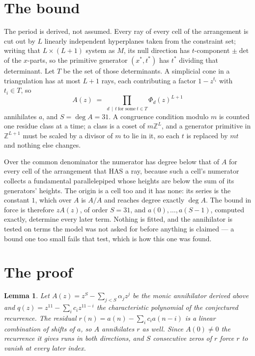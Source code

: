 \documentclass[11pt,a4paper]{article}
\theoremstyle{plain}
\newtheorem{lemma}[theorem]{Lemma}
\theoremstyle{definition}
\begin{document}
\section{The bound}

The period is derived, not assumed. Every ray of every cell of the arrangement is cut out by
$L$ linearly independent hyperplanes taken from the constraint set; writing that $L\times(L+1)$
system as $M$, its null direction has $t$-component $\pm\det$ of the $x$-parts, so the
primitive generator $(x^*,t^*)$ has $t^*$ dividing that determinant. Let $T$ be the set of
those determinants. A simplicial cone in a triangulation has at most $L+1$ rays, each
contributing a factor $1-z^{t_i}$ with $t_i\in T$, so
\[
A(z)\;=\;\prod_{d\,\mid\,t\ \text{for some}\ t\in T}\Phi_d(z)^{L+1}
\]
annihilates $a$, and $S=\deg A=31$. A congruence condition modulo $m$ is counted one residue
class at a time; a class is a coset of $m\mathbb{Z}^L$, and a generator primitive in
$\mathbb{Z}^{L+1}$ must be scaled by a divisor of $m$ to lie in it, so each $t$ is replaced
by $mt$ and nothing else changes.

Over the common denominator the numerator has degree below that of $A$ for every cell of the
arrangement that HAS a ray, because such a cell's numerator collects a fundamental
parallelepiped whose heights are below the sum of its generators' heights. The origin is a cell
too and it has none: its series is the constant $1$, which over $A$ is $A/A$ and reaches degree
exactly $\deg A$. The bound in force is therefore $zA(z)$, of order $S=31$, and
$a(0),\dots,a(S-1)$, computed exactly, determine every later term. Nothing is fitted, and the
annihilator is tested on terms the model was not asked for before anything is claimed --- a
bound one too small fails that test, which is how this one was found.

\section{The proof}

\begin{lemma}\label{lem:crit}
Let $A(z)=z^S-\sum_{j<S}\alpha_jz^{j}$ be the monic annihilator derived above and
$q(z)=z^{11}-\sum_ic_iz^{11-i}$ the characteristic polynomial of the conjectured
recurrence. The residual $r(n)=a(n)-\sum_ic_ia(n-i)$ is a linear combination of shifts of $a$,
so $A$ annihilates $r$ as well. Since $A(0)\ne0$ the recurrence it gives runs in both
directions, and $S$ consecutive zeros of $r$ force $r$ to vanish at every later index.
\end{lemma}
\end{document}
